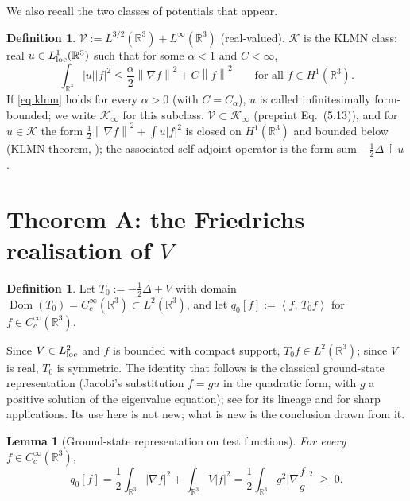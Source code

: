 \documentclass[11pt,a4paper]{article}
\theoremstyle{plain}
\newtheorem{lemma}[theorem]{Lemma}
\theoremstyle{definition}
\newtheorem{definition}[theorem]{Definition}
\theoremstyle{remark}
\newcommand{\R}{\mathbb{R}}
\newcommand{\VV}{\mathcal{V}}
\newcommand{\KK}{\mathcal{K}}
\newcommand{\LL}{L^{3/2}(\R^3)+L^\infty(\R^3)}
\newcommand{\norm}[1]{\left\|#1\right\|}
\newcommand{\ip}[2]{\left\langle #1,\,#2\right\rangle}
\DeclareMathOperator{\Dom}{Dom}
\begin{document}
We also recall the two classes of potentials that appear.
\begin{definition}\label{def:classes}
$\VV:=\LL$ (real-valued). $\KK$ is the KLMN class: real $u\in L^1_{\rm loc}(\R^3)$ such that for some $\alpha<1$ and $C<\infty$,
\begin{equation}\label{eq:klmn}
\int_{\R^3}|u||f|^2\le\frac{\alpha}{2}\norm{\nabla f}^2+C\norm f^2\qquad\text{for all }f\in H^1(\R^3).
\end{equation}
If \eqref{eq:klmn} holds for every $\alpha>0$ (with $C=C_\alpha$), $u$ is called infinitesimally form-bounded; we write $\KK_\infty$ for this subclass. $\VV\subset\KK_\infty$ (preprint Eq.~(5.13)), and for $u\in\KK$ the form $\tfrac12\norm{\nabla f}^2+\int u|f|^2$ is closed on $H^1(\R^3)$ and bounded below (KLMN theorem, \cite[Thm.~X.17]{RS2}); the associated self-adjoint operator is the form sum $-\tfrac12\Delta\dotplus u$.
\end{definition}

\section{Theorem A: the Friedrichs realisation of \texorpdfstring{$V$}{V}}\label{sec:A}

\begin{definition}\label{def:T0}
Let $T_0:=-\tfrac12\Delta+V$ with domain $\Dom(T_0)=C_c^\infty(\R^3)\subset L^2(\R^3)$, and let $q_0[f]:=\ip f{T_0f}$ for $f\in C_c^\infty(\R^3)$.
\end{definition}

Since $V\in L^2_{\rm loc}$ and $f$ is bounded with compact support, $T_0f\in L^2(\R^3)$; since $V$ is real, $T_0$ is symmetric. The identity that follows is the classical ground-state representation (Jacobi's substitution $f=gu$ in the quadratic form, with $g$ a positive solution of the eigenvalue equation); see \cite{FS08} for its lineage and for sharp applications. Its use here is not new; what is new is the conclusion drawn from it.

\begin{lemma}[Ground-state representation on test functions]\label{lem:gsr}
For every $f\in C_c^\infty(\R^3)$,
\begin{equation}\label{eq:gsr}
q_0[f]=\frac12\int_{\R^3}|\nabla f|^2+\int_{\R^3}V|f|^2=\frac12\int_{\R^3}g^2\Big|\nabla\frac fg\Big|^2\;\ge\;0 .
\end{equation}
\end{lemma}
\end{document}
